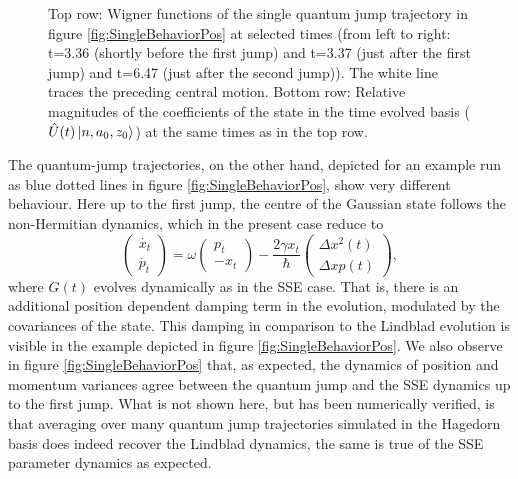 \documentclass[12pt]{iopart} %
\begin{document}
\begin{figure}
\begin{centering}
\caption{Top row: Wigner functions of the single quantum jump trajectory in figure \ref{fig:SingleBehaviorPos} at selected times (from left to right: t=3.36 (shortly before the first jump) and t=3.37 (just after the first jump) and t=6.47 (just after the second jump)). The white line traces the preceding central motion. Bottom row: Relative magnitudes of the coefficients of the state in the time evolved basis ($\hat U(t)\ket{n,a_0,z_0}$) at the same times as in the top row.} \label{fig:WigPlotsPos_QJ}
\end{centering}
\end{figure}
The quantum-jump trajectories, on the other hand, depicted for an example run as blue dotted lines in figure \ref{fig:SingleBehaviorPos}, show very different behaviour. Here up to the first jump, the centre of the Gaussian state follows the non-Hermitian dynamics, which in the present case reduce to 
\begin{equation}
  \begin{pmatrix}\dot{ x_t} \\ \dot{p_t} \end{pmatrix}
  =\omega \begin{pmatrix}  p_t \\ -x_t \end{pmatrix} - \frac{2\gamma x_t }{\hbar} \begin{pmatrix}\Delta x^2(t) \\\Delta xp(t)\end{pmatrix},
\end{equation} 
where $G(t)$ evolves dynamically as in the SSE case. That is, there is an additional position dependent damping term in the evolution, modulated by the covariances of the state. This damping in comparison to the Lindblad evolution is visible in the example depicted in figure \ref{fig:SingleBehaviorPos}.
We also observe in figure \ref{fig:SingleBehaviorPos} that, as expected, the dynamics of position and momentum variances agree between the quantum jump and the SSE dynamics up to the first jump. 
What is not shown here, but has been numerically verified, is that averaging over many quantum jump trajectories simulated in the Hagedorn basis does indeed recover the Lindblad dynamics, the same is true of the SSE parameter dynamics as expected.   
\end{document}
